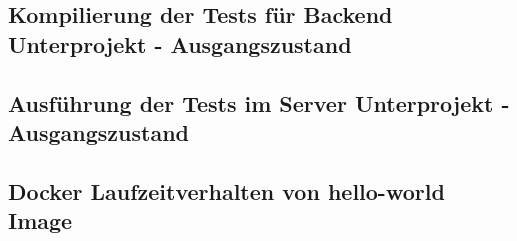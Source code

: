 \subsection{Kompilierung der Tests für Backend Unterprojekt - Ausgangszustand}
\label{subsec:APPENDIX_LISTINGS_OLD_BACKEND_COMPILE}


\subsection{Ausführung der Tests im Server Unterprojekt - Ausgangszustand}
\label{subsec:APPENDIX_LISTINGS_OLD_SERVER_TEST}


\subsection{Docker Laufzeitverhalten von hello-world Image}
\label{subsec:APPENDIX_LISTINGS_DOCKER_HELLO_WORLD}


\clearpage
